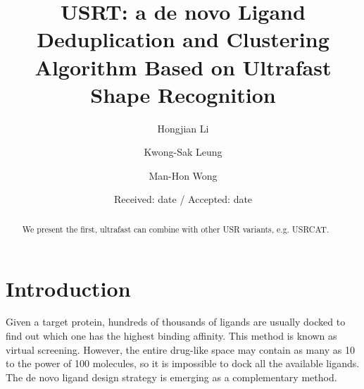 \documentclass[twocolumn]{svjour3}          %
\begin{document}
\title{USRT: a de novo Ligand Deduplication and Clustering Algorithm Based on Ultrafast Shape Recognition
}


\author{Hongjian Li \and Kwong-Sak Leung \and Man-Hon Wong}



\date{Received: date / Accepted: date}

\maketitle

\begin{abstract}

We present the first,
ultrafast
can combine with other USR variants, e.g. USRCAT.

\end{abstract}

\section{Introduction}
\label{intro}

Given a target protein, hundreds of thousands of ligands are usually docked to find out which one has the highest binding affinity. This method is known as virtual screening. However, the entire drug-like space may contain as many as 10 to the power of 100 molecules, so it is impossible to dock all the available ligands. The de novo ligand design strategy is emerging as a complementary method.
\end{document}
